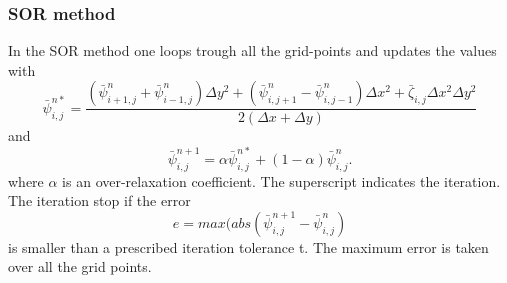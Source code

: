 \subsubsection{SOR method}
In the SOR method one loops trough all the grid-points and updates the values with
\begin{equation}
\bar{\psi}_{i,j}^{n*} = \frac{(\bar{\psi}^n_{i+1,j} + \bar{\psi}^n_{i-1,j}) \Delta y^2 +
(\bar{\psi}^n_{i,j+1} - \bar{\psi}^n_{i,j-1}) \Delta x^2 + \bar{\zeta}_{i,j} \Delta x^2 \Delta y^2}{2 (\Delta x + \Delta y)}
\end{equation}
and 
\begin{equation}
\bar{\psi}^{n+1}_{i,j} = \alpha \bar{\psi}_{i,j}^{n*} + (1-\alpha) \bar{\psi}^n_{i,j}.
\end{equation}
where $\alpha$ is an over-relaxation coefficient. The superscript indicates the iteration. The iteration stop if the error
\begin{equation}
e = max(abs(\bar{\psi}^{n+1}_{i,j} - \bar{\psi}^n_{i,j})
\end{equation}
is smaller than a prescribed iteration tolerance t.                                                                                                                                                                        The maximum error is taken over all the grid points.
%
